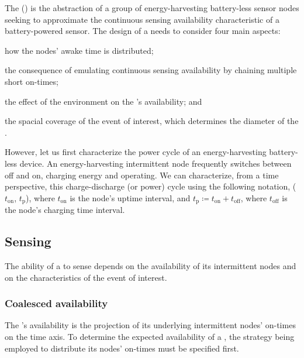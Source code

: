 The \fullsys (\sys) is the abstraction of a group of energy-harvesting battery-less sensor nodes seeking to approximate the continuous sensing availability characteristic of a battery-powered sensor. The design of a \sys needs to consider four main aspects: 
\begin{enumerate*}[label=(\roman*)]
\item how the nodes' awake time is distributed; 
\item the consequence of emulating continuous sensing availability by chaining multiple short on-times; 
\item the effect of the environment on the \sys's availability; and 
\item the spacial coverage of the event of interest, which determines the diameter of the \sys.
\end{enumerate*}

However, let us first characterize the power cycle of an energy-harvesting battery-less device. 
An energy-harvesting intermittent node frequently switches between off and on, charging energy and operating. We can characterize, from a time perspective, this charge-discharge (or power) cycle using the following notation, ($t_\text{on}$, $t_\text{p}$), where $t_\text{on}$ is the node's uptime interval, and $t_\text{p} \coloneqq t_\text{on} + t_\text{off}$, where $t_\text{off}$ is the node's charging time interval.

\subsection{Sensing}
The ability of a \sys to sense depends on the availability of its intermittent nodes and on the characteristics of the event of interest. 

\subsubsection{Coalesced availability}
\label{subSec:availability}
The \sys's availability is the projection of its underlying intermittent nodes' on-times on the time axis. 
To determine the expected availability of a \sys, the strategy being employed to distribute its nodes' on-times must be specified first.
%
